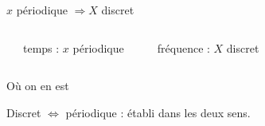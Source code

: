 \documentclass[aspectratio=43,10pt]{beamer}
\newcommand{\slidefig}[2]{%
\begin{center}
\resizebox{#1}{!}{}
\end{center}
}
\begin{document}
\begin{frame}{$x$ périodique $\Rightarrow X$ discret}
    \begin{columns}
        \centering
        \slidefig{\textwidth}{periodique-temps.tex}
        \begin{center}\small temps : $x$ périodique\end{center}

        \centering
        \slidefig{\textwidth}{periodique-frequence.tex}
        \begin{center}\small fréquence : $X$ discret\end{center}
    \end{columns}
\end{frame}


\begin{frame}{Où on en est}
    \slidefig{\textwidth}{rappel-graph-mid.tex}
    \vspace{1em}
    \begin{center}
        Discret $\Leftrightarrow$ périodique : établi dans les deux sens.
    \end{center}
\end{frame}
\end{document}
